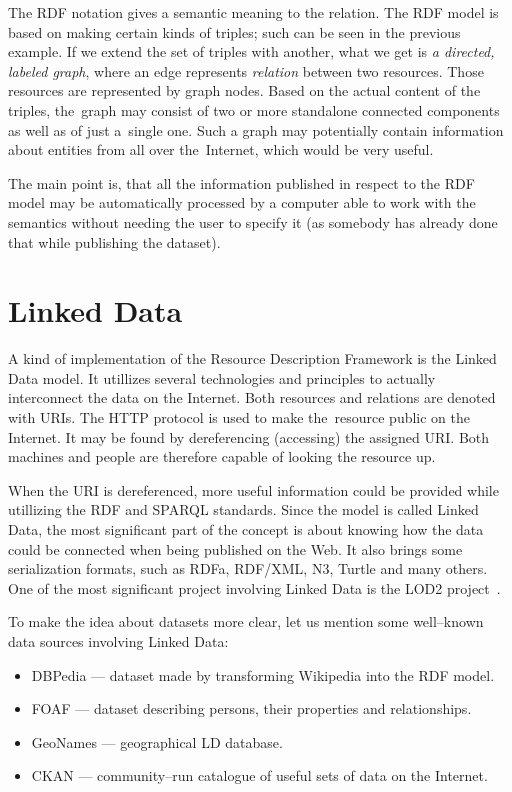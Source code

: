 The RDF notation gives a semantic meaning to the relation. The RDF model is based on making certain
kinds of triples; such can be seen in the previous example. If we extend the set of triples with another,
what we get is \emph{a directed, labeled graph}, where an edge represents \emph{relation} between two resources.
Those resources are represented by graph nodes. Based on the actual content of the triples,
the~graph may consist of two or more standalone connected components as well as of
just a~single one. Such a graph may potentially contain information about entities from all over
the~Internet, which would be very useful.

The main point is, that all the information published in respect to the RDF model may be
automatically processed by a computer able to work with the semantics without
needing the user to specify it (as somebody has already done that while publishing the dataset).

\section{Linked Data}

A kind of implementation of the Resource Description Framework is the Linked Data model.
It utillizes several technologies and principles to actually interconnect the data on the Internet.
Both resources and relations are denoted with URIs. The HTTP protocol is used to make
the~resource public on the Internet. It may be found by dereferencing (accessing) the assigned
URI. Both machines and people are therefore capable of looking the resource up.

When the URI is dereferenced, more useful information could be provided while utillizing the RDF
and SPARQL standards. Since the model is called Linked Data, the most significant part
of the concept is about knowing how the data could be connected when being published on the Web.
It also brings some serialization formats, such as RDFa, RDF/XML, N3, Turtle and many others.
One of the most significant project involving Linked Data is the LOD2 project~\cite{lod2}.

To make the idea about datasets more clear, let us mention some well--known data sources
involving Linked Data:

\begin{itemize}
\item DBPedia --- dataset made by transforming Wikipedia into the RDF model.
\item FOAF --- dataset describing persons, their properties and relationships.
\item GeoNames --- geographical LD database.
\item CKAN --- community--run catalogue of useful sets of data on the Internet.
\end{itemize}

